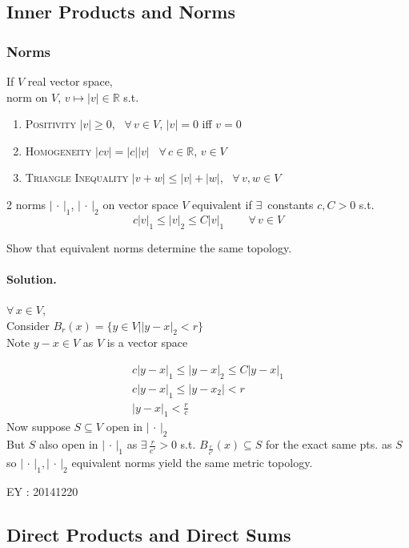 \subsection*{Inner Products and Norms}


\subsubsection*{Norms}

If $V$ real vector space, \\
\phantom{\quad } norm on $V$, $v \mapsto |v| \in \mathbb{R}$ s.t.
\begin{enumerate}
\item[(i)] \textsc{Positivity} $|v| \geq 0$, \, $\forall \, v \in V$, $|v| =0$ iff $v=0$ 
\item[(ii)] \textsc{Homogeneity} $|cv| = |c| |v|$ \quad \, $\forall \, c \in \mathbb{R}$, $v\in V$
\item[(iii)] \textsc{Triangle Inequality} $|v+w | \leq |v| + |w|$, \, $\forall \, v,w \in V$
\end{enumerate}

2 norms $| \, \cdot \, |_1$, $| \, \cdot \, |_2$ on vector space $V$ equivalent if $\exists \, $ constants $c,C >0$ s.t. 
\[
c|v|_1 \leq |v|_2 \leq C|v|_1 \quad \quad \, \forall \, v \in V
\]

\begin{exercise}
Show that equivalent norms determine the same topology.
\end{exercise}
\paragraph{Solution.} $\forall \, x \in V$, \\
Consider $B_r(x) = \{ y \in V | |y-x|_2 < r \}$ \\
\phantom{ \quad } Note $y-x \in V$ as $V$ is a vector space

\[
\begin{gathered}
  c|y-x|_1 \leq |y-x|_2 \leq C |y-x|_1 \\ 
 c|y-x|_1 \leq |y-x_2| < r \\
 |y-x|_1 < \frac{r}{c}
\end{gathered}
\]
Now suppose $S \subseteq V$ open in $| \, \cdot \, |_2$ \\
\phantom{ \quad } But $S$ also open in $| \, \cdot \, |_1$ as $\exists \, \frac{r}{c'} >0$ s.t. $B_{\frac{r}{c'}}(x) \subseteq S$ for the exact same pts. as $S$ \\
so $| \, \cdot \, |_1, | \, \cdot \, |_2$ equivalent norms yield the same metric topology.  

EY : 20141220



\subsection*{Direct Products and Direct Sums}
